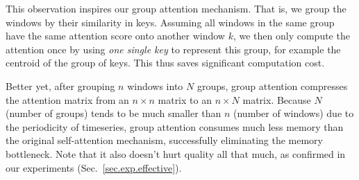 \begin{sloppypar}
This observation inspires our group attention mechanism. That is, we group the windows by their similarity in keys. 
Assuming all windows in the same group have the same attention score onto another window $k$, we then only compute the attention once by using {\it one single key} to represent this group, for example the centroid of the group of keys.
This thus saves significant computation cost.

Better yet, after grouping $n$ windows into $N$ groups, group attention compresses the attention matrix from an $n \times n$ matrix to an $n \times N$ matrix. Because $N$ (number of groups) tends to be much smaller than $n$ (number of windows) due to the periodicity of timeseries, group attention consumes much less memory than the original self-attention mechanism, successfully eliminating the memory bottleneck.  Note that it also doesn't hurt quality all that much, as confirmed in our experiments (Sec.~\ref{sec.exp.effective}).









\end{sloppypar}
